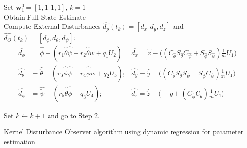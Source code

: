 \documentclass{standalone}
\let\oldnl\nl%
\newcommand{\nonl}{\renewcommand{\nl}{\let\nl\oldnl}}
\begin{document}
\begin{algorithm}[H] \label{algo:1}
\SetAlgoLined
{}
Set $\mathbf{w}_{1}^{0}= [1, 1, 1, 1]$, $k=1$ \\
Obtain Full State Estimate \\
\nonl {}
Compute External Disturbances $\hat{d_p}(t_k)=[d_x,d_y,d_z]$ and $\hat{d_\Theta}(t_k)=[d_\phi,d_\theta,d_\psi]$: 
	\[
		\begin{aligned}
    \hat{d_\phi}&=\hat{\ddot{\phi}}-(r_1\hat{\dot{\theta}}\hat{\dot{\psi}}-r_2\hat{\dot{\theta}}w+q_1U_2); &\hat{d_x}=\hat{\ddot{x}}-\Big((C_{\hat{\phi}}S_{\hat{\theta}}C_{\hat{\psi}}+S_{\hat{\phi}}S_{\hat{\psi}})\frac{1}{m}U_1\Big)\\
    \hat{d_\theta}&=\hat{\ddot{\theta}}-(r_3\hat{\dot{\phi}}\hat{\dot{\psi}}+r_4\hat{\dot{\phi}}w+q_2U_3);  &\hat{d_y}=\hat{\ddot{y}}-\Big((C_{\hat{\phi}}S_{\hat{\theta}}S_{\hat{\psi}}-S_{\hat{\phi}}C_{\hat{\psi}})\frac{1}{m}U_1\Big)\\
    \hat{d_\psi}&=\hat{\ddot{\psi}}-(r_5\hat{\dot{\theta}}\hat{\dot{\phi}}+q_3U_4); &\hat{d_z}=\hat{\ddot{z}}-\Big(-g+(C_{\hat{\phi}}C_{\hat{\theta}})\frac{1}{m}U_1\Big)
    \end{aligned}
	\]

Set $k \gets k+1$ and go to Step 2.
\caption{Kernel Disturbance Observer algorithm using dynamic regression for parameter estimation}
\end{algorithm}
\end{document}

